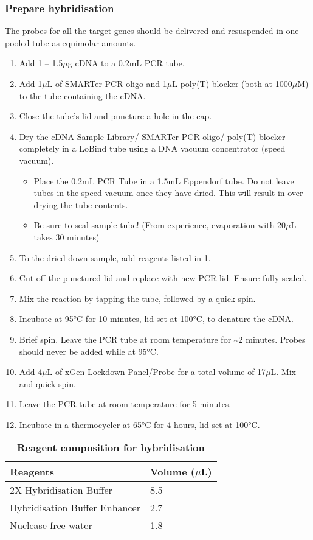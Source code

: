 \subsubsection{Prepare hybridisation}
\label{capture_prephyb}
The probes for all the target genes should be delivered and resuspended in one pooled tube as equimolar amounts. 
\begin{enumerate}
	\item Add 1 – 1.5$\mu$g cDNA to a 0.2mL PCR tube. 
	\item Add 1$\mu$L of SMARTer PCR oligo and 1$\mu$L poly(T) blocker (both at 1000$\mu$M) to the tube containing the cDNA.
	\item Close the tube’s lid and puncture a hole in the cap.
	\item Dry the cDNA Sample Library/ SMARTer PCR oligo/ poly(T) blocker completely in a LoBind tube using a DNA vacuum concentrator (speed vacuum).
	\begin{itemize}
		\item Place the 0.2mL PCR Tube in a 1.5mL Eppendorf tube. Do not leave tubes in the speed vacuum once they have dried. This will result in over drying the tube contents.
		\item Be sure to seal sample tube! (From experience, evaporation with 20$\mu$L takes 30 minutes)
	\end{itemize}
	\item To the dried-down sample, add reagents listed in \cref{tab:hybridisation}. 
	\item Cut off the punctured lid and replace with new PCR lid. Ensure fully sealed.
	\item Mix the reaction by tapping the tube, followed by a quick spin. 
	\item Incubate at 95°C for 10 minutes, lid set at 100°C, to denature the cDNA. 
	\item Brief spin. Leave the PCR tube at room temperature for \textasciitilde2 minutes. Probes should never be added while at 95°C. 
	\item Add 4$\mu$L of xGen Lockdown Panel/Probe for a total volume of 17$\mu$L. Mix and quick spin. 
	\item Leave the PCR tube at room temperature for 5 minutes.
	\item Incubate in a thermocycler at 65°C for 4 hours, lid set at 100°C. 
\end{enumerate} 

\begin{table}[]
	\centering
	\caption[Preparation for hybridisation]%
	{\textbf{Reagent composition for hybridisation}}
	\label{tab:hybridisation}
	\begin{tabular}{@{}ll@{}}
		\toprule
		Reagents                      & Volume ($\mu$L) \\ \midrule
		2X Hybridisation Buffer       & 8.5    \\
		Hybridisation Buffer Enhancer & 2.7    \\
		Nuclease-free water           & 1.8    \\ \bottomrule
	\end{tabular}
\end{table}

